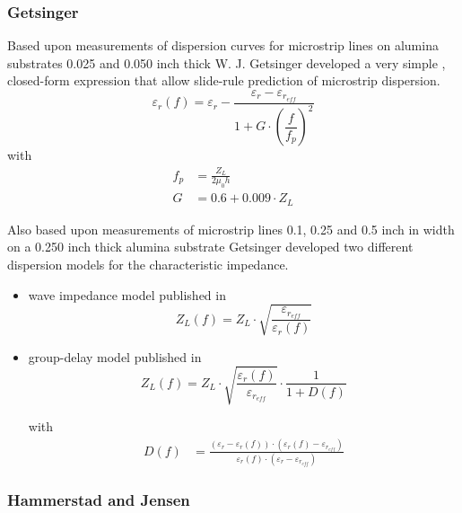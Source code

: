 \documentclass[10pt]{report}
\begin{document}
\subsubsection{Getsinger}

Based upon measurements of dispersion curves for microstrip lines on
alumina substrates 0.025 and 0.050 inch thick W. J. Getsinger
\cite{Getsinger} developed a very simple , closed-form expression that
allow slide-rule prediction of microstrip dispersion.
\begin{equation}
\varepsilon_{r}(f) = \varepsilon_{r} - \frac{\varepsilon_{r} - \varepsilon_{r_{eff}}}{1 + G\cdot \left(\dfrac{f}{f_{p}}\right)^{2}}
\end{equation}
with
\begin{align}
\label{eq:GetFp}
f_{p} &= \frac{Z_{L}}{2\mu_{0} h}\\
\label{eq:GetG}
G &= 0.6 + 0.009\cdot Z_{L}
\end{align}

Also based upon measurements of microstrip lines 0.1, 0.25 and 0.5
inch in width on a 0.250 inch thick alumina substrate Getsinger
\cite{Getsinger2} developed two different dispersion models for the
characteristic impedance.

\begin{itemize}
\item wave impedance model published in \cite{Getsinger2}
\begin{equation}
Z_{L}(f) = Z_{L}\cdot\sqrt{\frac{\varepsilon_{r_{eff}}}{\varepsilon_{r}(f)}}
\end{equation}

\item group-delay model published in \cite{Getsinger3}
\begin{equation}
Z_{L}(f) = Z_{L}\cdot\sqrt{\frac{\varepsilon_{r}(f)}{\varepsilon_{r_{eff}}}}\cdot\frac{1}{1 + D(f)}
\end{equation}

with
\begin{align}
D(f) &= \frac{\left(\varepsilon_{r} - \varepsilon_{r}(f)\right)\cdot\left(\varepsilon_{r}(f) - \varepsilon_{r_{eff}}\right)}{\varepsilon_{r}(f)\cdot\left(\varepsilon_{r} - \varepsilon_{r_{eff}}\right)}
\end{align}
\end{itemize}

\subsubsection{Hammerstad and Jensen}
\end{document}
